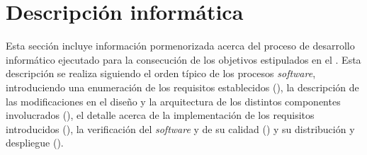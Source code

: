\chapter{Descripción informática}
\label{cap:descInformatica}
Esta sección incluye información pormenorizada acerca del proceso de desarrollo informático ejecutado para la consecución de los objetivos estipulados en el .
Esta descripción se realiza siguiendo el orden típico de los procesos \textit{software}, introduciendo una enumeración de los requisitos establecidos (), la descripción de las modificaciones en el diseño y la arquitectura de los distintos componentes involucrados (), el detalle acerca de la implementación de los requisitos introducidos (), la verificación del \textit{software} y de su calidad () y su distribución y despliegue ().










